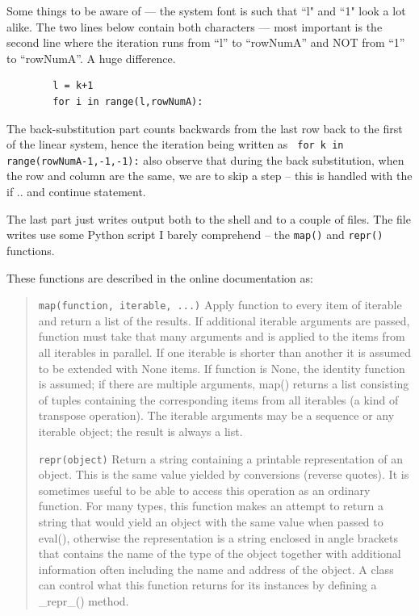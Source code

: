 Some things to be aware of --- the system font is such that ``l" and ``1" look a lot alike. 
The two lines below contain both characters --- most important is the second line where the iteration runs from ``l'' to ``rowNumA'' and NOT from ``1'' to ``rowNumA''.  A huge difference.

\begin{verbatim}
        l = k+1
        for i in range(l,rowNumA):
\end{verbatim}

The back-substitution part counts backwards from the last row back to the first of the linear system, hence the iteration being written as
\texttt{    for k in range(rowNumA-1,-1,-1):}   also observe that during the back substitution, when the row and column are the same, we are to skip a step -- this is handled with the if .. and continue statement.   

The last part just writes output both to the shell and to a couple of files.  The file writes use some Python script I barely comprehend -- the \texttt{map()} and \texttt{repr()} functions.   

These functions are described in the online documentation as:
\begin{quote}
\texttt{map(function, iterable, ...)}
Apply function to every item of iterable and return a list of the results. If additional iterable arguments are passed, function must take that many arguments and is applied to the items from all iterables in parallel. If one iterable is shorter than another it is assumed to be extended with None items. If function is None, the identity function is assumed; if there are multiple arguments, map() returns a list consisting of tuples containing the corresponding items from all iterables (a kind of transpose operation). The iterable arguments may be a sequence or any iterable object; the result is always a list.

\texttt{repr(object)}
Return a string containing a printable representation of an object. This is the same value yielded by conversions (reverse quotes). It is sometimes useful to be able to access this operation as an ordinary function. For many types, this function makes an attempt to return a string that would yield an object with the same value when passed to eval(), otherwise the representation is a string enclosed in angle brackets that contains the name of the type of the object together with additional information often including the name and address of the object. A class can control what this function returns for its instances by defining a \_repr\_() method.
\end{quote}

